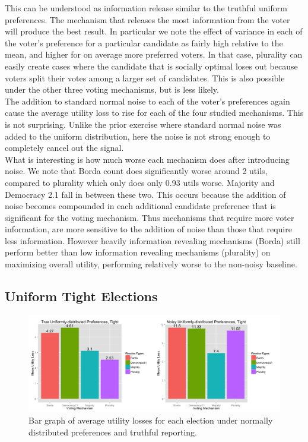 \documentclass[11pt]{scrartcl}
\begin{document}
This can be understood as information release similar to the truthful uniform preferences. The mechanism that releases the most information from the voter will produce the best result. In particular we note the effect of variance in each of the voter's preference for a particular candidate as fairly high relative to the mean, and higher for on average more preferred voters. In that case, plurality can easily create cases where the candidate that is socially optimal loses out because voters split their votes among a larger set of candidates. This is also possible under the other three voting mechanisms, but is less likely.\\

The addition to standard normal noise to each of the voter's preferences again cause the average utility loss to rise for each of the four studied mechanisms. This is not surprising. Unlike the prior exercise where standard normal noise was added to the uniform distribution, here the noise is not strong enough to completely cancel out the signal.\\

What is interesting is how much worse each mechanism does after introducing noise. We note that Borda count does significantly worse around 2 utils, compared to plurality which only does only 0.93 utils worse. Majority and Democracy 2.1 fall in between these two. This occurs because the addition of noise becomes compounded in each additional candidate preference that is significant for the voting mechanism. Thus mechanisms that require more voter information, are more sensitive to the addition of noise than those that require less information. However heavily information revealing mechanisms (Borda) still perform better than low information revealing mechanisms (plurality) on maximizing overall utility, performing relatively worse to the non-noisy baseline.


\subsection{Uniform Tight Elections}

\begin{figure}[H]\center
\includegraphics[scale=0.38]{uniform_tight.png}
\caption{Bar graph of average utility losses for each election under normally distributed preferences and truthful reporting.}
\end{figure}
\end{document}
